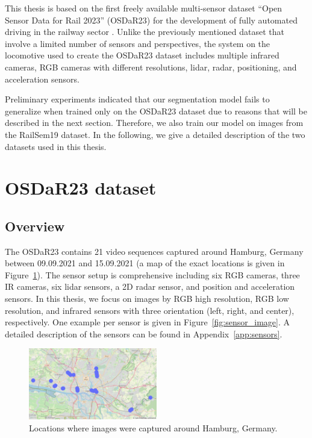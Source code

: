 \documentclass[Master,MDS,english]{BASE/twbook} %
\begin{document}
This thesis is based on the first freely available multi-sensor dataset ``Open Sensor Data for Rail 2023'' (OSDaR23) for the development of fully automated driving in the railway sector \citep{DB2023, tagiew2023osdar23}.
Unlike the previously mentioned dataset that involve a limited number of sensors and perspectives, the system on the locomotive used to create the OSDaR23 dataset includes multiple infrared cameras, RGB cameras with different resolutions, lidar, radar, positioning, and acceleration sensors.

Preliminary experiments indicated that our segmentation model fails to generalize when trained only on the OSDaR23 dataset due to reasons that will be described in the next section. Therefore, we also train our model on images from the RailSem19 dataset.
In the following, we give a detailed description of the two datasets used in this thesis.


\section{OSDaR23 dataset} \label{sec:OSDaR23}

\subsection{Overview}

The OSDaR23 contains 21 video sequences captured around Hamburg, Germany between 09.09.2021 and 15.09.2021 (a map of the exact locations is given in Figure~\ref{fig:map}). 
The sensor setup is comprehensive including six RGB cameras, three
IR cameras, six lidar sensors, a 2D radar sensor, and position and acceleration sensors. In this thesis, we focus on images by RGB high resolution, RGB low resolution, and infrared sensors with three orientation (left, right, and center), respectively. One example per sensor is given in Figure~\ref{fig:sensor_image}. A detailed description of the sensors can be found in Appendix~\ref{app:sensors}.

\begin{figure}[h]
\centering
\includegraphics[width=0.5\textwidth]{images/datasets/db/map}
\caption{Locations where images were captured around Hamburg, Germany. }
\label{fig:map}
\end{figure}
\end{document}
